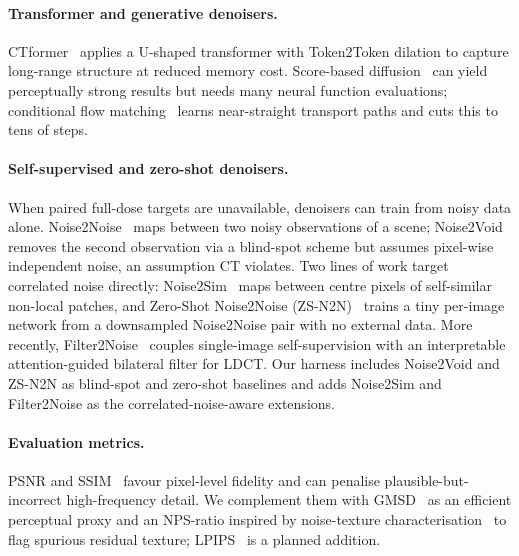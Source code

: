 \documentclass[10pt,twocolumn]{article}
\begin{document}
\paragraph{Transformer and generative denoisers.}
CTformer~\cite{wang2022ctformer} applies a U-shaped transformer with
Token2Token dilation to capture long-range structure at reduced memory
cost.  Score-based diffusion~\cite{song2021scorebased,gao2023corediff}
can yield perceptually strong results but needs many neural function
evaluations; conditional flow matching~\cite{lipman2022flow,albergo2022building}
learns near-straight transport paths and cuts this to tens of steps.

\paragraph{Self-supervised and zero-shot denoisers.}
When paired full-dose targets are unavailable, denoisers can train from
noisy data alone.  Noise2Noise~\cite{lehtinen2018noise2noise} maps between
two noisy observations of a scene; Noise2Void~\cite{krull2019noise2void}
removes the second observation via a blind-spot scheme but assumes
pixel-wise independent noise, an assumption CT violates.  Two lines
of work target correlated noise directly:
Noise2Sim~\cite{niu2020noise2sim} maps between centre pixels of
self-similar non-local patches, and Zero-Shot Noise2Noise
(ZS-N2N)~\cite{mansour2023zsn2n} trains a tiny per-image network from a
downsampled Noise2Noise pair with no external data.  More recently,
Filter2Noise~\cite{sun2025filter2noise} couples single-image
self-supervision with an interpretable attention-guided bilateral filter
for LDCT.  Our harness includes Noise2Void and ZS-N2N as blind-spot and
zero-shot baselines and adds Noise2Sim and Filter2Noise as the
correlated-noise-aware extensions.

\paragraph{Evaluation metrics.}
PSNR and SSIM~\cite{wang2004image} favour pixel-level fidelity and can
penalise plausible-but-incorrect high-frequency detail.  We complement
them with GMSD~\cite{xue2014gradient} as an efficient perceptual proxy and
an NPS-ratio inspired by noise-texture
characterisation~\cite{solomon2012characterization} to flag spurious
residual texture; LPIPS~\cite{zhang2018unreasonable} is a planned addition.

\end{document}
